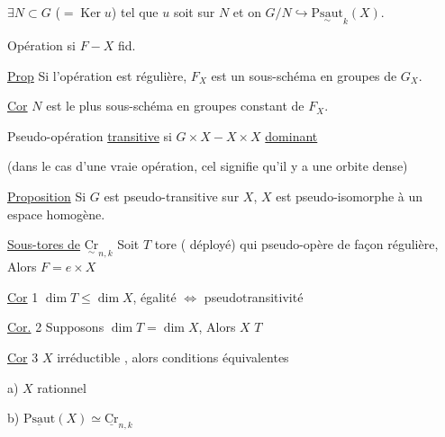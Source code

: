 $\exists N\subset G$ ($=\operatorname{Ker}u$) tel que $u$ soit  sur $N$ et on  $G/N\hookrightarrow\underset{\sim}{\mathrm{Psaut}}_k(X)$.


Opération  si $F\mathbin{-} X$ fid. 

\uline{Prop} Si l'opération est régulière, $F_X$ est un sous-schéma en groupes de $G_X$.

\uline{Cor} $N$ est le plus  sous-schéma en groupes constant de $F_X$.

Pseudo-opération \uline{transitive} si $G\times X\mathbin{-}X\times X$ \uline{dominant}

(dans le cas d'une vraie opération, cel signifie qu'il y a une  orbite dense)

\uline{Proposition} Si $G$ est pseudo-transitive sur $X$, $X$ est pseudo-isomorphe à un espace homogène.

\uline{Sous-tores de} $\underset{\sim}{\mathrm{Cr}}_{n,k}$  Soit $T$ tore ( déployé) qui pseudo-opère de façon    régulière,  Alors $F=e\times X$


\uline{Cor} 1 $\dim T\leq\dim X$, égalité $\Longleftrightarrow$ pseudotransitivité

\uline{Cor.} 2 Supposons $\dim T=\dim X$,  Alors $X$ \deleted{$\unsure{\simeq|\approx}$} $T$

\uline{Cor} 3 $X$ irréductible , alors conditions équivalentes

a) $X$ rationnel

b) $\underline{\mathrm{Psaut}}(X)\simeq\underline{\mathrm{Cr}}_{n,k}$

